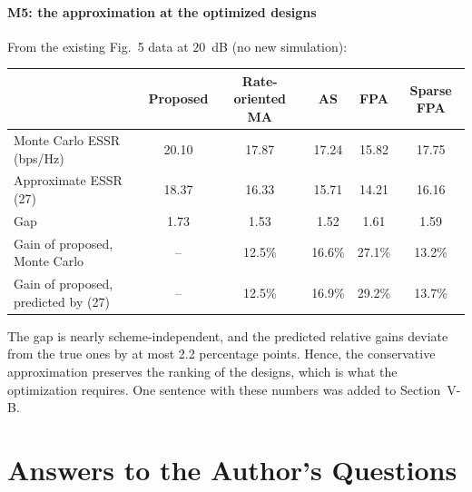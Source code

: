 \documentclass[10pt,a4paper]{article}
\begin{document}
\subsection{M5: the approximation at the optimized designs}\label{sec:m5}
From the existing Fig.~5 data at $20$~dB (no new simulation):
\begin{center}\small
\begin{tabular}{lccccc}
\toprule
 & Proposed & Rate-oriented MA & AS & FPA & Sparse FPA \\ \midrule
Monte Carlo ESSR (bps/Hz) & 20.10 & 17.87 & 17.24 & 15.82 & 17.75 \\
Approximate ESSR (27) & 18.37 & 16.33 & 15.71 & 14.21 & 16.16 \\
Gap & 1.73 & 1.53 & 1.52 & 1.61 & 1.59 \\
Gain of proposed, Monte Carlo & -- & 12.5\% & 16.6\% & 27.1\% & 13.2\% \\
Gain of proposed, predicted by (27) & -- & 12.5\% & 16.9\% & 29.2\% & 13.7\% \\
\bottomrule
\end{tabular}
\end{center}
The gap is nearly scheme-independent, and the predicted relative gains deviate from the true ones by at most 2.2 percentage points. Hence, the conservative approximation preserves the ranking of the designs, which is what the optimization requires. One sentence with these numbers was added to Section~V-B.

\part{Answers to the Author's Questions}\label{part:questions}
\end{document}
